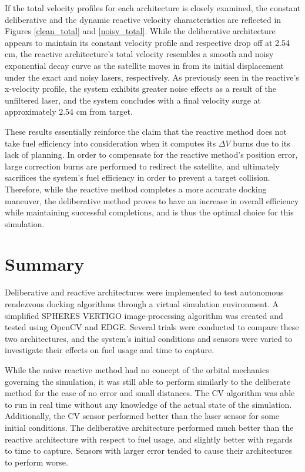 \documentclass[journal, 10pt]{IEEEtran}
\begin{document}
If the total velocity profiles for each architecture is closely examined, the constant deliberative and the dynamic reactive velocity characteristics are reflected in Figures \ref{clean_total} and \ref{noisy_total}. While the deliberative architecture appears to maintain its constant velocity profile and respective drop off at 2.54 cm, the reactive architecture's total velocity resembles a smooth and noisy exponential decay curve as the satellite moves in from its initial displacement under the exact and noisy lasers, respectively. As previously seen in the reactive's x-velocity profile, the system exhibits greater noise effects as a result of the unfiltered laser, and the system concludes with a final velocity surge at approximately 2.54 cm from target.

These results essentially reinforce the claim that the reactive method does not take fuel efficiency into consideration when it computes its $\Delta V$  burns due to its lack of planning. In order to compensate for the reactive method's position error, large correction burns are performed to redirect the satellite, and ultimately sacrifices the system's fuel efficiency in order to prevent a target collision. Therefore, while the reactive method completes a more accurate docking maneuver, the deliberative method proves to have an increase in overall efficiency while maintaining successful completions, and is thus the optimal choice for this simulation.

\section{Summary}
Deliberative and reactive architectures were implemented to test autonomous rendezvous docking algorithms through a virtual simulation environment. A simplified SPHERES VERTIGO image-processing algorithm was created and tested using OpenCV and EDGE. Several trials were conducted to compare these two architectures, and the system's initial conditions and sensors were varied to investigate their effects on fuel usage and time to capture.

While the naive reactive method had no concept of the orbital mechanics governing the simulation, it was still able to perform similarly to the deliberate method for the case of no error and small distances. The CV algorithm was able to run in real time without any knowledge of the actual state of the simulation. Additionally, the CV sensor performed better than the laser sensor for some initial conditions. The deliberative architecture performed much better than the reactive architecture with respect to fuel usage, and slightly better with regards to time to capture. Sensors with larger error tended to cause their architectures to perform worse. 
\end{document}
